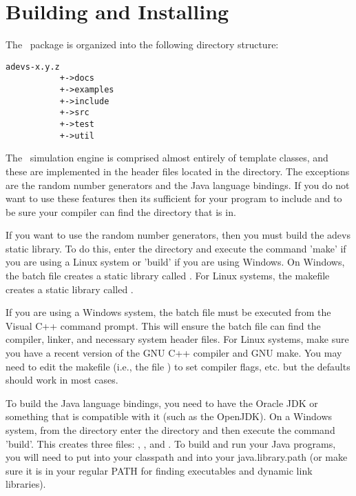 \chapter{Building and Installing}
The \adevs\ package is organized into the following directory structure:
\begin{verbatim}
adevs-x.y.z
           +->docs
           +->examples
           +->include
           +->src
           +->test
           +->util
\end{verbatim}
The \adevs\ simulation engine is comprised almost entirely of template classes, and these are implemented in the header files located in the  directory. The exceptions are the random number generators and the Java language bindings. If you do not want to use these features then its sufficient for your program to include  and to be sure your compiler can find the  directory that  is in. 

If you want to use the random number generators, then you must build the adevs static library. To do this, enter the  directory and execute the command 'make' if you are using a Linux system or 'build' if you are using Windows. On Windows, the batch file creates a static library called . For Linux systems, the makefile creates a static library called .

If you are using a Windows system, the batch file must be executed from the Visual C++ command prompt. This will ensure the batch file can find the compiler, linker, and necessary system header files. For Linux systems, make sure you have a recent version of the GNU C++ compiler and GNU make. You may need to edit the makefile (i.e., the file ) to set compiler flags, etc. but the defaults should work in most cases.

To build the Java language bindings, you need to have the Oracle JDK or something that is compatible with it (such as the OpenJDK). On a Windows system, from the  directory enter the  directory and then execute the command 'build'. This creates three files: , , and . To build and run your Java programs, you will need to put  into your classpath and  into your java.library.path (or make sure it is in your regular PATH for finding executables and dynamic link libraries).

